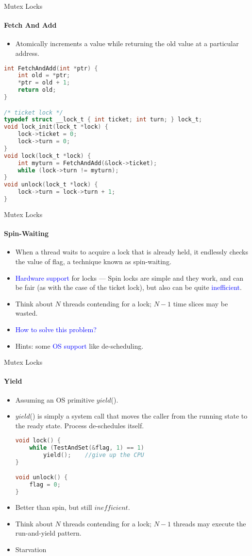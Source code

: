 \documentclass[10pt]{beamer}
\begin{document}
\begin{frame}[fragile]{Mutex Locks}
\framesubtitle{Fetch And Add}
\begin{itemize}
\item Atomically increments a value while returning the old value at a particular address. 
\end{itemize}
\begin{lstlisting}[language=C]
int FetchAndAdd(int *ptr) {
	int old = *ptr;
	*ptr = old + 1;
	return old;
}

/* ticket lock */
typedef struct __lock_t { int ticket; int turn; } lock_t;
void lock_init(lock_t *lock) {
	lock->ticket = 0;
	lock->turn = 0;
}
void lock(lock_t *lock) {
	int myturn = FetchAndAdd(&lock->ticket);
	while (lock->turn != myturn);
}
void unlock(lock_t *lock) {
	lock->turn = lock->turn + 1;
}
\end{lstlisting}
\end{frame}

\begin{frame}{Mutex Locks}
\framesubtitle{Spin-Waiting}
\begin{itemize}
 
\item When a thread waits to acquire a lock that is already held, it endlessly checks the value of flag, a technique known as \alert{spin-waiting}. 
\item \textcolor{blue}{Hardware support} for locks --- \alert{Spin locks} are simple and they work, and can be fair (as with the case of the ticket lock), but also can be quite \textcolor{blue}{inefficient}.
\item Think about $N$ threads contending for a lock; $N - 1$ time slices may be wasted.
\item \textcolor{blue}{How to solve this problem?}
\item Hints: some \textcolor{blue}{OS support} like de-scheduling.
\end{itemize}
\end{frame}

\begin{frame}[fragile]{Mutex Locks}
\framesubtitle{Yield}
\begin{itemize}
 
\item Assuming an OS primitive $yield$().
\item $yield$() is simply a system call that moves the caller from the running state to the ready state. Process de-schedules itself.
\vspace{6pt}\\
\begin{lstlisting}[language=C]
void lock() {
	while (TestAndSet(&flag, 1) == 1)
		yield();	//give up the CPU
}

void unlock() {
	flag = 0;
}
\end{lstlisting}
\item Better than spin, but still $inefficient$.
\item Think about $N$ threads contending for a lock; $N - 1$ threads may execute the run-and-yield pattern.
\item Starvation
\end{itemize}
\end{frame}
\end{document}

